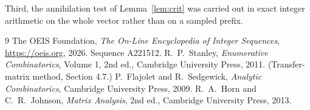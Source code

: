 \documentclass[11pt,a4paper]{article}
\theoremstyle{plain}
\theoremstyle{definition}
\begin{document}
Third, the annihilation test of Lemma~\ref{lem:crit} was carried out in exact integer
arithmetic on the whole vector rather than on a sampled prefix.

\begin{thebibliography}{9}
 The OEIS Foundation, \emph{The On-Line Encyclopedia of Integer
Sequences}, \url{https://oeis.org}, 2026. Sequence A221512.
 R.~P.~Stanley, \emph{Enumerative Combinatorics}, Volume 1, 2nd ed.,
Cambridge University Press, 2011. (Transfer-matrix method, Section 4.7.)
 P.~Flajolet and R.~Sedgewick, \emph{Analytic Combinatorics}, Cambridge
University Press, 2009.
 R.~A.~Horn and C.~R.~Johnson, \emph{Matrix Analysis}, 2nd ed., Cambridge
University Press, 2013.
\end{thebibliography}
\end{document}
